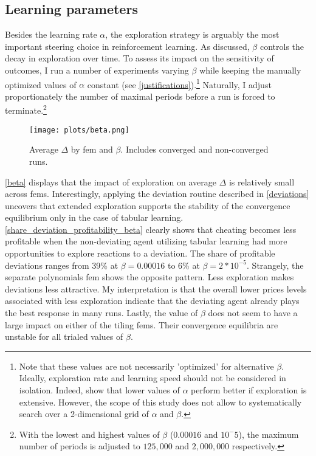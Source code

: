 \subsection{Learning parameters}\label{vary_parameter}

Besides the learning rate $\alpha$, the exploration strategy is arguably the most important steering choice in reinforcement learning. As discussed, $\beta$ controls the decay in exploration over time. To assess its impact on the sensitivity of outcomes, I run a number of experiments varying $\beta$ while keeping the manually optimized values of $\alpha$ constant (see \autoref{justifications}).\footnote{Note that these values are not necessarily 'optimized' for alternative $\beta$. Ideally, exploration rate and learning speed should not be considered in isolation. Indeed, \textcite{calvano_artificial_2020} show that lower values of $\alpha$ perform better if exploration is extensive. However, the scope of this study does not allow to systematically search over a 2-dimensional grid of $\alpha$ and $\beta$.} Naturally, I adjust  proportionately the number of maximal periods before a run is forced to terminate.\footnote{With the lowest and highest values of $\beta$ ($0.00016$ and $10^-{5}$), the maximum number of periods is adjusted to $125,000$ and $2,000,000$ respectively.}

\begin{figure}
	\texttt{[image: plots/beta.png]}
	\caption[Average $\Delta$ by \gls{fem} and $\beta$]{Average $\Delta$ by \gls{fem} and $\beta$. Includes converged and non-converged runs.}
	\label{beta}
\end{figure}

\autoref{beta} displays that the impact of exploration on average $\Delta$ is relatively small across \gls{fem}s. Interestingly, applying the deviation routine described in \autoref{deviations} uncovers that extended exploration supports the stability of the convergence equilibrium only in the case of tabular learning. \autoref{share_deviation_profitability_beta} clearly shows that cheating becomes less profitable when the non-deviating agent utilizing tabular learning had more opportunities to explore reactions to a deviation. The share of profitable deviations ranges from 39\% at $\beta = 0.00016$ to 6\% at $\beta= 2*10^{-5}$. Strangely, the separate polynomials \gls{fem} shows the opposite pattern. Less exploration makes deviations less attractive. My interpretation is that the overall lower prices levels associated with less exploration indicate that the deviating agent already plays the best response in many runs. Lastly, the value of $\beta$ does not seem to have a large impact on either of the tiling \gls{fem}s. Their convergence equilibria are unstable for all trialed values of $\beta$.

